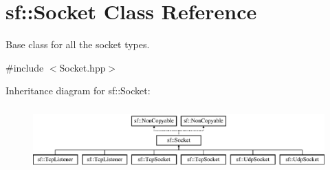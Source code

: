 \hypertarget{classsf_1_1_socket}{\section{sf\-:\-:Socket Class Reference}
\label{classsf_1_1_socket}
}


Base class for all the socket types.  




{\ttfamily \#include $<$Socket.\-hpp$>$}

Inheritance diagram for sf\-:\-:Socket\-:\begin{figure}[H]
\begin{center}
\leavevmode
\includegraphics[height=2.477876cm]{classsf_1_1_socket}
\end{center}
\end{figure}
